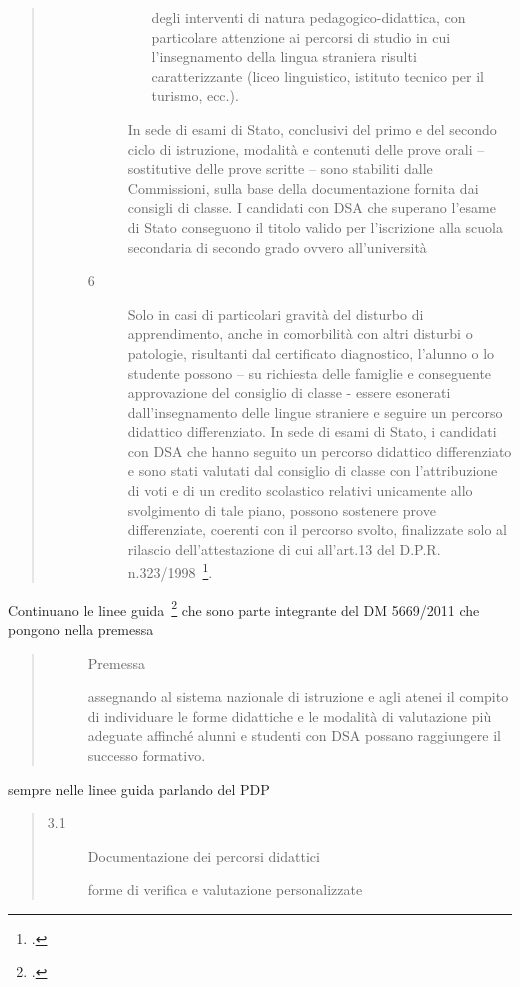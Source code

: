 \begin{quote}
\begin{description}
\begin{description}
\begin{itemize}
				degli interventi di natura pedagogico-didattica, con particolare attenzione ai percorsi di
				studio in cui l'insegnamento della lingua straniera risulti caratterizzante (liceo linguistico,
				istituto tecnico per il turismo, ecc.).
			\end{itemize}
			In sede di esami di Stato, conclusivi del primo e del secondo ciclo di istruzione, modalità e
			contenuti delle prove orali – sostitutive delle prove scritte – sono stabiliti dalle Commissioni,
			sulla base della documentazione fornita dai consigli di classe.
			I candidati con DSA che superano l'esame di Stato conseguono il titolo valido per l'iscrizione
			alla scuola secondaria di secondo grado ovvero all'università
			\item[6]Solo in casi di particolari gravità del disturbo di apprendimento, anche in comorbilità con
			altri disturbi o patologie, risultanti dal certificato diagnostico, l'alunno o lo studente possono –
			su richiesta delle famiglie e conseguente approvazione del consiglio di classe - essere esonerati
			dall'insegnamento delle lingue straniere e seguire un percorso didattico differenziato.
			In sede di esami di Stato, i candidati con DSA che hanno seguito un percorso didattico
			differenziato e sono stati valutati dal consiglio di classe con l'attribuzione di voti e di un
			credito scolastico relativi unicamente allo svolgimento di tale piano, possono sostenere prove
			differenziate, coerenti con il percorso svolto, finalizzate solo al rilascio dell'attestazione di cui
			all'art.13 del D.P.R. n.323/1998~\footcite{DPR_323_1998}.
		\end{description}
	\end{description}
\end{quote}
Continuano le linee guida~\footcite{LineGuida2011} che sono parte integrante del DM 5669/2011 che pongono nella premessa 
\begin{quote}
	\begin{description}
		\item[] Premessa
		
		\mancatesto assegnando al sistema nazionale di
		 istruzione e agli atenei il compito di individuare le forme didattiche e le modalità di valutazione più adeguate affinché alunni e studenti con DSA possano raggiungere il successo formativo.
	\end{description}
\end{quote} 
sempre nelle linee guida parlando del PDP
\begin{quote}
	\begin{description}
		\item[3.1]Documentazione dei percorsi didattici
		
		forme di verifica e valutazione personalizzate
	\end{description}
\end{quote}
